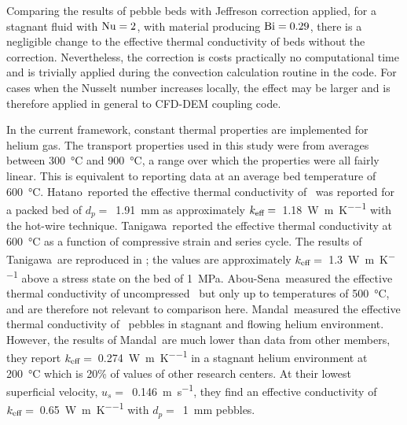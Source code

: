 \FloatBarrier

Comparing the results of pebble beds with Jeffreson correction applied, for a stagnant fluid with $\mathrm{Nu} = 2$, with material producing $\mathrm{Bi} = 0.29$, there is a negligible change to the effective thermal conductivity of beds without the correction. Nevertheless, the correction is costs practically no computational time and is trivially applied during the convection calculation routine in the code. For cases when the Nusselt number increases locally, the effect may be larger and is therefore applied in general to CFD-DEM coupling code.

In the current framework, constant thermal properties are implemented for helium gas. The transport properties used in this study were from averages between \SI{300}{\celsius} and \SI{900}{\celsius}, a range over which the properties were all fairly linear. This is equivalent to reporting data at an average bed temperature of \SI{600}{\celsius}. Hatano\etal~reported the effective thermal conductivity of \lit~was reported for a packed bed of $d_p = $~\SI{1.91}{\milli\meter} as approximately $k_\text{eff} =$~\SI{1.18}{\watt\per\meter\per\kelvin} with the hot-wire technique.\cite{Hatano2003} Tanigawa\etal~reported the effective thermal conductivity at \SI{600}{\celsius} as a function of compressive strain and series cycle.\cite{Tanigawa2005801} The results of Tanigawa\etal~are reproduced in ; the values are approximately $k_\text{eff} =$~\SI{1.3}{\watt\per\meter\per\kelvin} above a stress state on the bed of \SI{1}{\mega\pascal}. Abou-Sena\etal~measured the effective thermal conductivity of uncompressed \lit~but only up to temperatures of \SI{500}{\celsius}, and are therefore not relevant to comparison here.\cite{Abou-Sena:2007ff} Mandal\etal~measured the effective thermal conductivity of \lit~pebbles in stagnant and flowing helium environment.\cite{Mandal2012} However, the results of Mandal\etal~are much lower than data from other members, they report $k_\text{eff} =$~\SI{0.274}{\watt\per\meter\per\kelvin} in a stagnant helium environment at \SI{200}{\celsius} which is 20\% of values of other research centers. At their lowest superficial velocity, $u_s = $~\SI{0.146}{\meter\per\second}, they find an effective conductivity of $k_\text{eff} =$~\SI{0.65}{\watt\per\meter\per\kelvin} with $d_p = $~\SI{1}{\milli\meter} pebbles.

